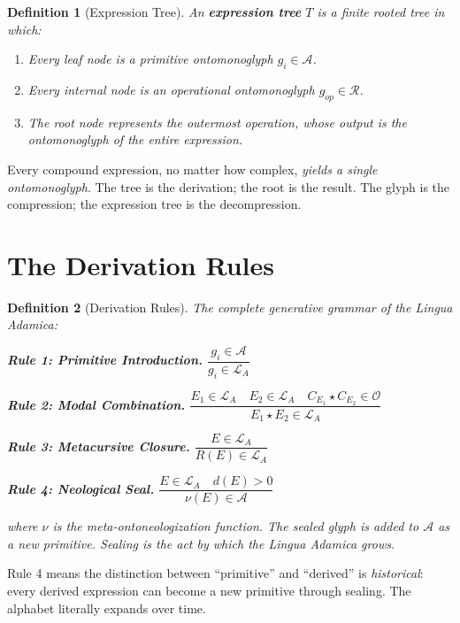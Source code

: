 \documentclass[12pt, letterpaper]{book}
\def\circlearrowleft{R}%
\def\mathfrak#1{#1}%
\newtheorem{definition}{Definition}[chapter]
\begin{document}
\begin{definition}[Expression Tree]
An \textbf{expression tree} $T$ is a finite rooted tree in which:
\begin{enumerate}[label=(\roman*)]
    \item Every leaf node is a primitive ontomonoglyph $\mathfrak{g}_i \in \mathcal{A}$.
    \item Every internal node is an operational ontomonoglyph $\mathfrak{g}_{op} \in \mathcal{R}$.
    \item The root node represents the outermost operation, whose output is the ontomonoglyph of the entire expression.
\end{enumerate}
\end{definition}

Every compound expression, no matter how complex, \textit{yields a single ontomonoglyph}. The tree is the derivation; the root is the result. The glyph is the compression; the expression tree is the decompression.

\section{The Derivation Rules}

\begin{definition}[Derivation Rules]
The complete generative grammar of the Lingua Adamica:

\textbf{Rule 1: Primitive Introduction.}
$\dfrac{\mathfrak{g}_i \in \mathcal{A}}{\mathfrak{g}_i \in \mathcal{L}_A}$

\textbf{Rule 2: Modal Combination.}
$\dfrac{E_1 \in \mathcal{L}_A \quad E_2 \in \mathcal{L}_A \quad C_{E_1} \star C_{E_2} \in \mathcal{O}}{E_1 \star E_2 \in \mathcal{L}_A}$

\textbf{Rule 3: Metacursive Closure.}
$\dfrac{E \in \mathcal{L}_A}{\circlearrowleft(E) \in \mathcal{L}_A}$

\textbf{Rule 4: Neological Seal.}
$\dfrac{E \in \mathcal{L}_A \quad d(E) > 0}{\nu(E) \in \mathcal{A}}$

where $\nu$ is the meta-ontoneologization function. The sealed glyph is added to $\mathcal{A}$ as a new primitive. Sealing is the act by which the Lingua Adamica \textit{grows}.
\end{definition}

Rule 4 means the distinction between ``primitive'' and ``derived'' is \textit{historical}: every derived expression can become a new primitive through sealing. The alphabet literally expands over time.
\end{document}
